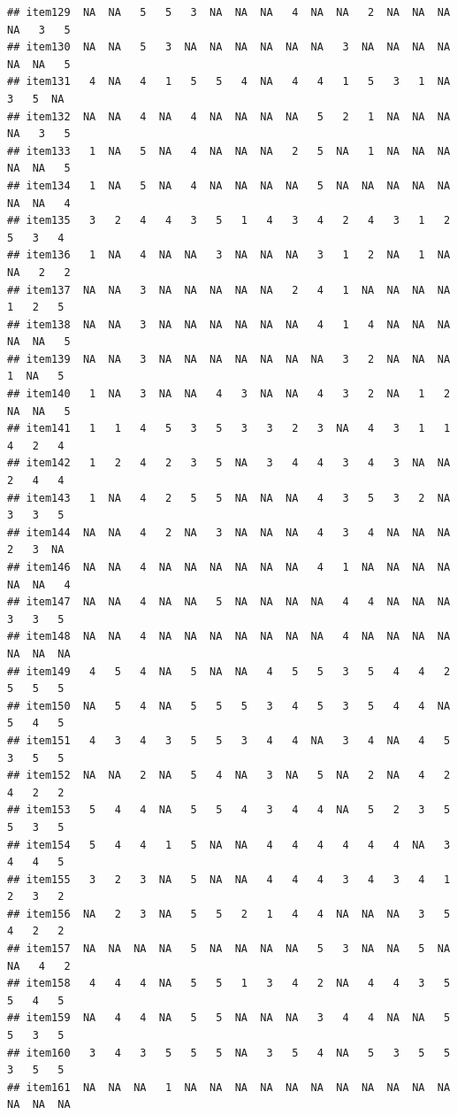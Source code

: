 \documentclass[
  man]{apa6}
\begin{document}
\begin{verbatim}
## item129  NA  NA   5   5   3  NA  NA  NA   4  NA  NA   2  NA  NA  NA  NA   3   5
## item130  NA  NA   5   3  NA  NA  NA  NA  NA  NA   3  NA  NA  NA  NA  NA  NA   5
## item131   4  NA   4   1   5   5   4  NA   4   4   1   5   3   1  NA   3   5  NA
## item132  NA  NA   4  NA   4  NA  NA  NA  NA   5   2   1  NA  NA  NA  NA   3   5
## item133   1  NA   5  NA   4  NA  NA  NA   2   5  NA   1  NA  NA  NA  NA  NA   5
## item134   1  NA   5  NA   4  NA  NA  NA  NA   5  NA  NA  NA  NA  NA  NA  NA   4
## item135   3   2   4   4   3   5   1   4   3   4   2   4   3   1   2   5   3   4
## item136   1  NA   4  NA  NA   3  NA  NA  NA   3   1   2  NA   1  NA  NA   2   2
## item137  NA  NA   3  NA  NA  NA  NA  NA   2   4   1  NA  NA  NA  NA   1   2   5
## item138  NA  NA   3  NA  NA  NA  NA  NA  NA   4   1   4  NA  NA  NA  NA  NA   5
## item139  NA  NA   3  NA  NA  NA  NA  NA  NA  NA   3   2  NA  NA  NA   1  NA   5
## item140   1  NA   3  NA  NA   4   3  NA  NA   4   3   2  NA   1   2  NA  NA   5
## item141   1   1   4   5   3   5   3   3   2   3  NA   4   3   1   1   4   2   4
## item142   1   2   4   2   3   5  NA   3   4   4   3   4   3  NA  NA   2   4   4
## item143   1  NA   4   2   5   5  NA  NA  NA   4   3   5   3   2  NA   3   3   5
## item144  NA  NA   4   2  NA   3  NA  NA  NA   4   3   4  NA  NA  NA   2   3  NA
## item146  NA  NA   4  NA  NA  NA  NA  NA  NA   4   1  NA  NA  NA  NA  NA  NA   4
## item147  NA  NA   4  NA  NA   5  NA  NA  NA  NA   4   4  NA  NA  NA   3   3   5
## item148  NA  NA   4  NA  NA  NA  NA  NA  NA  NA   4  NA  NA  NA  NA  NA  NA  NA
## item149   4   5   4  NA   5  NA  NA   4   5   5   3   5   4   4   2   5   5   5
## item150  NA   5   4  NA   5   5   5   3   4   5   3   5   4   4  NA   5   4   5
## item151   4   3   4   3   5   5   3   4   4  NA   3   4  NA   4   5   3   5   5
## item152  NA  NA   2  NA   5   4  NA   3  NA   5  NA   2  NA   4   2   4   2   2
## item153   5   4   4  NA   5   5   4   3   4   4  NA   5   2   3   5   5   3   5
## item154   5   4   4   1   5  NA  NA   4   4   4   4   4   4  NA   3   4   4   5
## item155   3   2   3  NA   5  NA  NA   4   4   4   3   4   3   4   1   2   3   2
## item156  NA   2   3  NA   5   5   2   1   4   4  NA  NA  NA   3   5   4   2   2
## item157  NA  NA  NA  NA   5  NA  NA  NA  NA   5   3  NA  NA   5  NA  NA   4   2
## item158   4   4   4  NA   5   5   1   3   4   2  NA   4   4   3   5   5   4   5
## item159  NA   4   4  NA   5   5  NA  NA  NA   3   4   4  NA  NA   5   5   3   5
## item160   3   4   3   5   5   5  NA   3   5   4  NA   5   3   5   5   3   5   5
## item161  NA  NA  NA   1  NA  NA  NA  NA  NA  NA  NA  NA  NA  NA  NA  NA  NA  NA

\end{verbatim}
\end{document}
